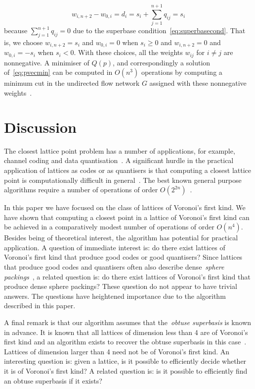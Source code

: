 \documentclass[final,leqno]{siamltex}
\begin{document}
\[
w_{i,n+2} - w_{0,i} = d_i = s_i + \sum_{j=1}^{n+1} q_{ij} = s_i
\]  
because $\sum_{j=1}^{n+1} q_{ij} = 0$ due to the superbase condition~\eqref{eq:superbasecond}.  That is, we choose $w_{i,n+2} = s_i$ and $w_{0,i} = 0$ when $s_i \geq 0$ and $w_{i,n+2}=0$ and $w_{0,i} = -s_i$ when $s_i < 0$.  With these choices, all the weights $w_{ij}$ for $i \neq j$ are nonnegative.  A minimiser of $Q(p)$, and correspondingly a solution of~\eqref{eq:pvecmin} can be computed in $O(n^3)$ operations by computing a minimum cut in the undirected flow network $G$ assigned with these nonnegative weights~\cite{Picard_min_cuts_1974,Sankaran_solving_CDMA_mincut_1998,Ulukus_cdma_mincut_1998,Cormen2001}.  %


\section{Discussion}\label{sec:discussion}

The closest lattice point problem has a number of applications, for example, channel coding and data quantisation~\cite{Conway1983VoronoiCodes,Conway1982VoronoiRegions,Conway1982FastQuantDec,Erex2004_lattice_decoding,Erez2005}.  A significant hurdle in the practical application of lattices as codes or as quantisers is that computing a closest lattice point is computationally difficult in general~\cite{micciancio_hardness_2001}.  The best known general purpose algorithms require a number of operations of order $O(2^{2n})$~\cite{Micciancio09adeterministic}.

In this paper we have focused on the class of lattices of Voronoi's first kind.  We have shown that computing a closest point in a lattice of Voronoi's first kind can be achieved in a comparatively modest number of operations of order $O(n^4)$.  Besides being of theoretical interest, the algorithm has potential for practical application.  A question of immediate interest is: do there exist lattices of Voronoi's first kind that produce good codes or good quantisers?  Since lattices that produce good codes and quantisers often also describe dense~\emph{sphere packings}~\cite{SPLAG}, a related question is: do there exist lattices of Voronoi's first kind that produce dense sphere packings?  These question do not appear to have trivial answers.  The questions have heightened importance due to the algorithm described in this paper.

A final remark is that our algorithm assumes that the~\emph{obtuse superbasis} is known in advance.  It is known that all lattices of dimension less than 4 are of Voronoi's first kind and an algorithm exists to recover the obtuse superbasis in this case~\cite{SPLAG}.  Lattices of dimension larger than 4 need not be of Voronoi's first kind.  An interesting question is: given a lattice, is it possible to efficiently decide whether it is of Voronoi's first kind?  A related question is: is it possible to efficiently find an obtuse superbasis if it exists?
\end{document}
